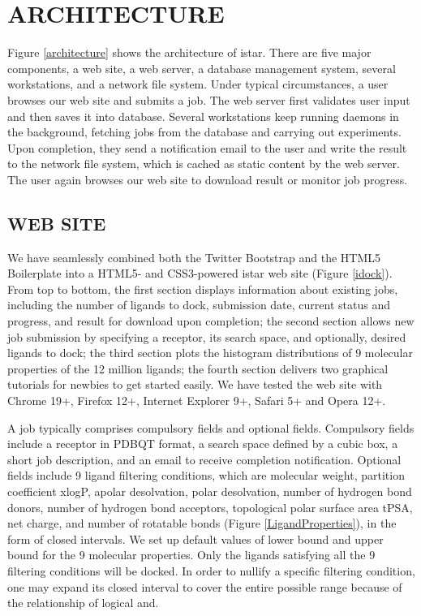 \documentclass[12pt]{article}
\begin{document}
\section*{\sffamily \Large ARCHITECTURE}

Figure \ref{architecture} shows the architecture of istar. There are five major components, a web site, a web server, a database management system, several workstations, and a network file system. Under typical circumstances, a user browses our web site and submits a job. The web server first validates user input and then saves it into database. Several workstations keep running daemons in the background, fetching jobs from the database and carrying out experiments. Upon completion, they send a notification email to the user and write the result to the network file system, which is cached as static content by the web server. The user again browses our web site to download result or monitor job progress.

\subsection*{\sffamily \large WEB SITE}

We have seamlessly combined both the Twitter Bootstrap and the HTML5 Boilerplate into a HTML5- and CSS3-powered istar web site (Figure \ref{idock}). From top to bottom, the first section displays information about existing jobs, including the number of ligands to dock, submission date, current status and progress, and result for download upon completion; the second section allows new job submission by specifying a receptor, its search space, and optionally, desired ligands to dock; the third section plots the histogram distributions of 9 molecular properties of the 12 million ligands; the fourth section delivers two graphical tutorials for newbies to get started easily. We have tested the web site with Chrome 19+, Firefox 12+, Internet Explorer 9+, Safari 5+ and Opera 12+.

A job typically comprises compulsory fields and optional fields. Compulsory fields include a receptor in PDBQT format, a search space defined by a cubic box, a short job description, and an email to receive completion notification. Optional fields include 9 ligand filtering conditions, which are molecular weight, partition coefficient xlogP, apolar desolvation, polar desolvation, number of hydrogen bond donors, number of hydrogen bond acceptors, topological polar surface area tPSA, net charge, and number of rotatable bonds (Figure \ref{LigandProperties}), in the form of closed intervals. We set up default values of lower bound and upper bound for the 9 molecular properties. Only the ligands satisfying all the 9 filtering conditions will be docked. In order to nullify a specific filtering condition, one may expand its closed interval to cover the entire possible range because of the relationship of logical and.
\end{document}
